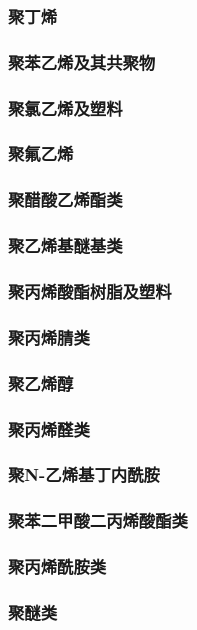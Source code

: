 \documentclass[UTF8]{../../ApplicationUniverse}
\begin{document}
        \subsubsection{聚丁烯}
    \subsubsection{聚苯乙烯及其共聚物}
    \subsubsection{聚氯乙烯及塑料}
    \subsubsection{聚氟乙烯}
    \subsubsection{聚醋酸乙烯酯类}
    \subsubsection{聚乙烯基醚基类}
    \subsubsection{聚丙烯酸酯树脂及塑料}
    \subsubsection{聚丙烯腈类}
    \subsubsection{聚乙烯醇}
    \subsubsection{聚丙烯醛类}
    \subsubsection{聚N-乙烯基丁内酰胺}
    \subsubsection{聚苯二甲酸二丙烯酸酯类}
    \subsubsection{聚丙烯酰胺类}
    \subsubsection{聚醚类}
\end{document}

